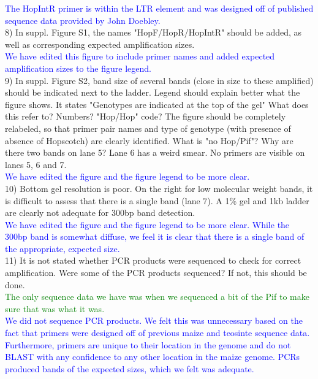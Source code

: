 \documentclass[11pt]{article}
\newcommand{\res}[1]{\noindent \textcolor{blue}{{#1}} \\}
\newcommand{\lev}[1]{\noindent \textcolor{green}{{#1}} \\}
\begin{document}
\res{The HopIntR primer is within the LTR element and was designed off of published sequence data provided by John Doebley.}

8) In suppl. Figure S1, the names "HopF/HopR/HopIntR" should be added, as well as corresponding expected amplification sizes.\\

\res{We have edited this figure to include primer names and added expected amplification sizes to the figure legend.}

9) In suppl. Figure S2, band size of several bands (close in size to these amplified) should be indicated next to the ladder. Legend should explain better what the figure shows. It states "Genotypes are indicated at the top of the gel" What does this refer to? Numbers? "Hop/Hop" code? The figure should be completely relabeled, so that primer pair names and type of genotype (with presence of absence of Hopscotch) are clearly identified. What is "no Hop/Pif"? Why are there two bands on lane 5? Lane 6 has a weird smear. No primers are visible on lanes 5, 6 and 7.\\

\res{We have edited the figure and the figure legend to be more clear.}

10) Bottom gel resolution is poor. On the right for low molecular weight bands, it is difficult to assess that there is a single band (lane 7). A 1\% gel and 1kb ladder are clearly not adequate for 300bp band detection.\\

\res{We have edited the figure and the figure legend to be more clear.  While the 300bp band is somewhat diffuse, we feel it is clear that there is a single band of the appropriate, expected size.}

11) It is not stated whether PCR products were sequenced to check for correct amplification. Were some of the PCR products sequenced? If not, this should be done.\\

\lev{The only sequence data we have was when we sequenced a bit of the Pif to make sure that was what it was.}

\res{We did not sequence PCR products. We felt this was unnecessary based on the fact that primers were designed off of previous maize and teosinte sequence data. Furthermore, primers are unique to their location in the genome and do not BLAST with any confidence to any other location in the maize genome. PCRs produced bands of the expected sizes, which we felt was adequate.}
\end{document}
